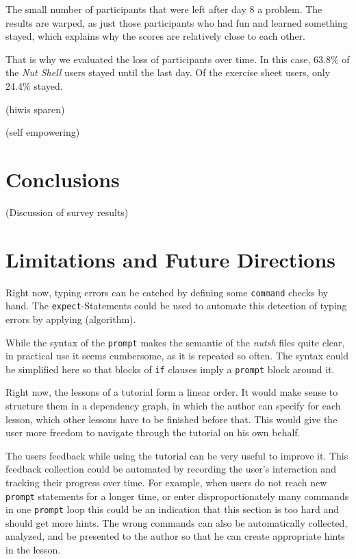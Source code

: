 \documentclass[paper=a4,twoside,abstract=on,cleardoublepage=empty,numbers=noenddot,toc=bib,12pt,appendixprefix=true]{scrreprt}
\begin{document}
The small number of participants that were left after day 8 a problem. The results are warped, as just those participants who had fun and learned something stayed, which explains why the scores are relatively close to each other.

That is why we evaluated the loss of participants over time. In this case, 63.8\% of the \emph{Nut Shell} users stayed until the last day. Of the exercise sheet users, only 24.4\% stayed.

(hiwis sparen)

(self empowering)

\chapter{Conclusions}

(Discussion of survey results)

\chapter{Limitations and Future Directions}

Right now, typing errors can be catched by defining some \texttt{command} checks by hand. The \texttt{expect}-Statements could be used to automate this detection of typing errors by applying (algorithm).

While the syntax of the \texttt{prompt} makes the semantic of the \emph{nutsh} files quite clear, in practical use it seems cumbersome, as it is repeated so often. The syntax could be simplified here so that blocks of \texttt{if} clauses imply a \texttt{prompt} block around it.

Right now, the lessons of a tutorial form a linear order. It would make sense to structure them in a dependency graph, in which the author can specify for each lesson, which other lessons have to be finished before that. This would give the user more freedom to navigate through the tutorial on his own behalf.


The users feedback while using the tutorial can be very useful to improve it. This feedback collection could be automated by recording the user's interaction and tracking their progress over time. For example, when users do not reach new \texttt{prompt} statements for a longer time, or enter disproportionately many commands in one \texttt{prompt} loop this could be an indication that this section is too hard and should get more hints. The wrong commands can also be automatically collected, analyzed, and be presented to the author so that he can create appropriate hints in the lesson.
\end{document}
